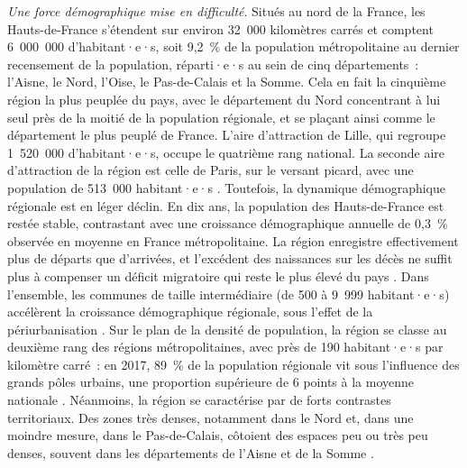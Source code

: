\begin{refsegment}
\textsl{Une force démographique mise en difficulté}. Situés au nord de la France, les Hauts-de-France s'étendent sur environ 32~000 kilomètres carrés et comptent 6~000~000 d'habitant·e·s, soit 9,2~\% de la population métropolitaine au dernier recensement de la population, réparti·e·s au sein de cinq départements~: l'Aisne, le Nord, l'Oise, le Pas-de-Calais et la Somme. Cela en fait la cinquième région la plus peuplée du pays, avec le département du Nord concentrant à lui seul près de la moitié de la population régionale, et se plaçant ainsi comme le département le plus peuplé de France. L'aire d'attraction de Lille, qui regroupe 1~520~000 d'habitant·e·s, occupe le quatrième rang national. La seconde aire d'attraction de la région est celle de Paris, sur le versant picard, avec une population de 513~000 habitant·e·s \textcolor{blue}{\autocite{leroux_region_2023}}. Toutefois, la dynamique démographique régionale est en léger déclin. En dix ans, la population des Hauts-de-France est restée stable, contrastant avec une croissance démographique annuelle de 0,3~\% observée en moyenne en France métropolitaine. La région enregistre effectivement plus de départs que d'arrivées, et l'excédent des naissances sur les décès ne suffit plus à compenser un déficit migratoire qui reste le plus élevé du pays \textcolor{blue}{\autocite{insee_essentiel_2024}}. Dans l'ensemble, les communes de taille intermédiaire (de 500 à 9~999 habitant·e·s) accélèrent la croissance démographique régionale, sous l'effet de la périurbanisation \textcolor{blue}{\autocite{leroux_region_2023}}. Sur le plan de la densité de population, la région se classe au deuxième rang des régions métropolitaines, avec près de 190 habitant·e·s par kilomètre carré~: en 2017, 89~\% de la population régionale vit sous l'influence des grands pôles urbains, une proportion supérieure de 6 points à la moyenne nationale \textcolor{blue}{\autocite{insee_plus_2020}}. Néanmoins, la région se caractérise par de forts contrastes territoriaux. Des zones très denses, notamment dans le Nord et, dans une moindre mesure, dans le Pas-de-Calais, côtoient des espaces peu ou très peu denses, souvent dans les départements de l'Aisne et de la Somme \textcolor{blue}{\autocite{ministere_de_la_culture_atlas_2023}}.%


\end{refsegment}
